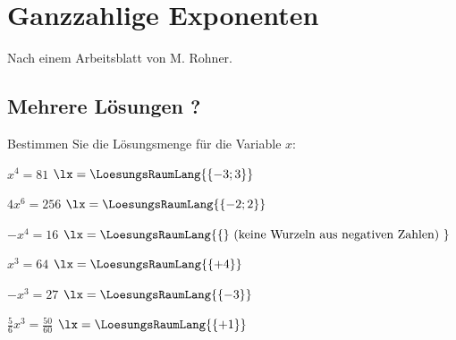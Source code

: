 



\usepackage{amssymb} %
\renewcommand{\metaHeaderLine}{Potenzgleichungen}
\renewcommand{\arbeitsblattTitel}{(BMS)}

\arbeitsblattHeader{}


\section{Ganzzahlige Exponenten}
\small{Nach einem Arbeitsblatt von M. Rohner.}


\subsection{Mehrere Lösungen ?}
Bestimmen Sie die Lösungsmenge für die Variable $x$:


\begin{bbwAufgabenBlock}

\item $x^4=81$ \hspace{10mm} $\lx = \LoesungsRaumLang{\{-3; 3\}}$

\item
 $4x^6=256$ \hspace{10mm} $\lx=\LoesungsRaumLang{\{-2; 2\}}$
 \noTRAINER{\newpage}

\item
 $-x^4=16$ \hspace{10mm} $\lx=\LoesungsRaumLang{\{\} \text{ (keine
 Wurzeln aus negativen Zahlen) }}$

\item
 $x^3=64$ \hspace{10mm} $\lx=\LoesungsRaumLang{\{+4\} }$

\item
 $-x^3=27$ \hspace{10mm} $\lx=\LoesungsRaumLang{\{-3\} }$
 \noTRAINER{\newpage}

\item
 $\frac56 x^3 = \frac{50}{60}$ \hspace{10mm} $\lx=\LoesungsRaumLang{\{+1\}  }$

\end{bbwAufgabenBlock}
\noTRAINER{\newpage}



